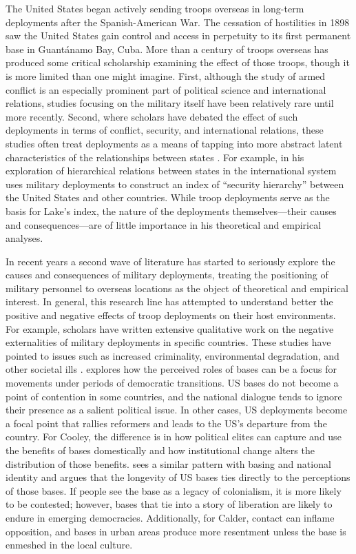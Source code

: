 The United States began actively sending troops overseas in long-term deployments after the Spanish-American War. The cessation of hostilities in 1898 saw the United States gain control and access in perpetuity to its first permanent base in Guant\'{a}namo Bay, Cuba. More than a century of troops overseas has produced some critical scholarship examining the effect of those troops, though it is more limited than one might imagine. First, although the study of armed conflict is an especially prominent part of political science and international relations, studies focusing on the military itself have been relatively rare until more recently. Second, where scholars have debated the effect of such deployments in terms of conflict, security, and international relations, these studies often treat deployments as a means of tapping into more abstract latent characteristics of the relationships between states \cite{Harkavy1989,Ikenberry2004,Lake2009a,Wohlforth1999,davis2011}. For example, in his exploration of hierarchical relations between states in the international system  uses military deployments to construct an index of ``security hierarchy'' between the United States and other countries. While troop deployments serve as the basis for Lake's index, the nature of the deployments themselves---their causes and consequences---are of little importance in his theoretical and empirical analyses. 

In recent years a second wave of literature has started to seriously explore the causes and consequences of military deployments, treating the positioning of military personnel to overseas locations as the object of theoretical and empirical interest. In general, this research line has attempted to understand better the positive and negative effects of troop deployments on their host environments. For example, scholars have written extensive qualitative work on the negative externalities of military deployments in specific countries. These studies have pointed to issues such as increased criminality, environmental degradation, and other societal ills \cite{Hohn2010,Vine2015,Yeo2011}.  explores how the perceived roles of bases can be a focus for movements under periods of democratic transitions. US bases do not become a point of contention in some countries, and the national dialogue tends to ignore their presence as a salient political issue. In other cases, US deployments become a focal point that rallies reformers and leads to the US's departure from the country. For Cooley, the difference is in how political elites can capture and use the benefits of bases domestically and how institutional change alters the distribution of those benefits.  sees a similar pattern with basing and national identity and argues that the longevity of US bases ties directly to the perceptions of those bases. If people see the base as a legacy of colonialism, it is more likely to be contested; however, bases that tie into a story of liberation are likely to endure in emerging democracies. Additionally, for Calder, contact can inflame opposition, and bases in urban areas produce more resentment unless the base is enmeshed in the local culture.  

